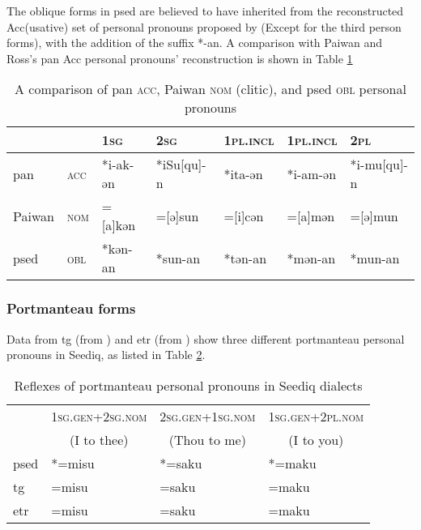The oblique forms in \acl{psed} are believed to have inherited from the reconstructed Acc(usative) set of personal pronouns proposed by \textcite{ross2006casepronoun} (Except for the third person forms), with the addition of the suffix *-an. A comparison with Paiwan and Ross's \acs{pan} Acc personal pronouns' reconstruction is shown in Table \ref{tab:panacc}

\begin{table}[!htbp]
\centering
\caption{A comparison of \acs{pan} \textsc{acc}, Paiwan \textsc{nom} (clitic), and \acl{psed} \textsc{obl} personal pronouns}
\label{tab:panacc}
\begin{tabular}{lllllll}
\hline
       &     & \textsc{1sg}      & \textsc{2sg}        & \textsc{1pl.incl} & \textsc{1pl.incl} & \textsc{2pl}         \\\hline
\acs{pan}   & \textsc{acc} & *i-ak-ən & *iSu[qu]-n & *ita-ən  & *i-am-ən & *i-mu[qu]-n \\
Paiwan & \textsc{nom} & =[a]kən  & =[ə]sun    & =[i]cən  & =[a]mən  & =[ə]mun     \\
\acl{psed} & \textsc{obl} & *kən-an  & *sun-an    & *tən-an  & *mən-an  & *mun-an    \\ \hline
\end{tabular}
\end{table}

\subsubsection{Portmanteau forms}

Data from \acl{tg} (from \cite[62]{Sung2018Sedgrammar}) and \acl{etr} (from \cite[74]{Lee2018Trugrammar}) show three different portmanteau personal pronouns in Seediq, as listed in Table \ref{tab:porref}.

\begin{table}[!htbp]
\centering
\caption{Reflexes of portmanteau personal pronouns in Seediq dialects}
\label{tab:porref}
\begin{tabular}{llll}
\hline
                     & \textsc{1sg.gen+2sg.nom}                 & \textsc{2sg.gen+1sg.nom}                  & \textsc{1sg.gen+2pl.nom}                \\ 
\multicolumn{1}{c}{} & \multicolumn{1}{c}{(I to thee)} & \multicolumn{1}{c}{(Thou to me)} & \multicolumn{1}{c}{(I to you)} \\ \hline
\acl{psed}               & *=misu                          & *=saku                           & *=maku                         \\
\acs{tg}                 & =misu                           & =saku                            & =maku                          \\
\acs{etr}                & =misu                           & =saku                            & =maku          \\ \hline                
\end{tabular}
\end{table}

